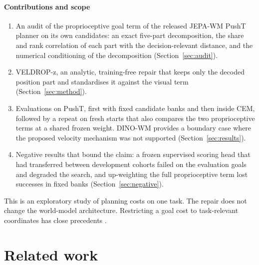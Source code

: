 \paragraph{Contributions and scope}
\begin{enumerate}[leftmargin=*,itemsep=2pt]
\item An audit of the proprioceptive goal term of the released JEPA-WM PushT planner on its own candidates: an exact
  five-part decomposition, the share and rank correlation of each part with the decision-relevant distance, and the
  numerical conditioning of the decomposition (Section~\ref{sec:audit}).
\item VELDROP-z, an analytic, training-free repair that keeps only the decoded position part and standardises it
  against the visual term (Section~\ref{sec:method}).
\item Evaluations on PushT, first with fixed candidate banks and then inside CEM, followed by a repeat on \RTwN{}
  fresh starts that also compares the two proprioceptive terms at a shared frozen weight. DINO-WM provides a boundary
  case where the proposed velocity mechanism was not supported (Section~\ref{sec:results}).
\item Negative results that bound the claim: a frozen supervised scoring head that had transferred between development
  cohorts failed on the evaluation goals and degraded the search, and up-weighting the full proprioceptive term lost
  successes in fixed banks (Section~\ref{sec:negative}).
\end{enumerate}
This is an exploratory study of planning costs on one task. The repair does not change the world-model
architecture. Restricting a goal cost to task-relevant coordinates has close precedents
\cite{andrychowicz2017her,velez2026gsher,wu2026firm,li2026trm,jang2026projection}.

\section{Related work}
